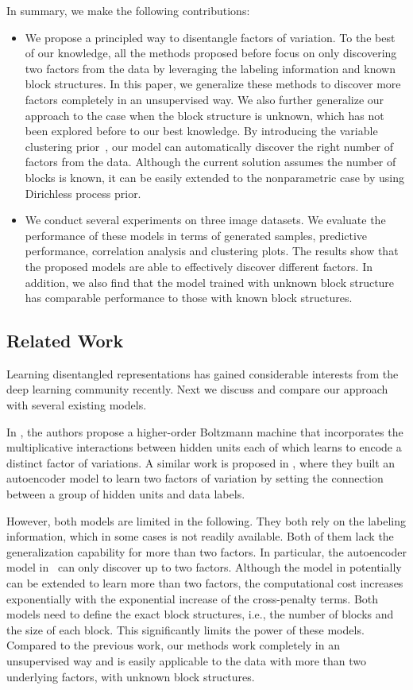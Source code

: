 In summary, we make the following contributions:
\begin{itemize}
\item We propose a principled way to disentangle factors of variation. To the best of our knowledge, all the methods proposed before focus on only discovering two factors from the data by leveraging the labeling information and known block structures. In this paper, we generalize these methods to discover more factors completely in an unsupervised way. We also further generalize our approach to the case when the block structure is unknown, which has not been explored before to our best knowledge. By introducing the variable clustering prior~\cite{palla2012nonparametric}, our model can automatically discover the right number of factors from the data. Although the current solution assumes the number of blocks is known, it can be easily extended to the nonparametric case by using Dirichless process prior.
\item We conduct several experiments on three image datasets. We evaluate the performance of these models in terms of generated samples, predictive performance, correlation analysis and clustering plots. The results show that the proposed models are able to effectively discover different factors. In addition, we also find that the model trained with unknown block structure has comparable performance to those with known block structures.
\end{itemize}


\subsection{Related Work}
Learning disentangled representations has gained considerable interests from the deep learning community recently. Next we discuss and compare our approach with several existing models.

In \cite{reed2014learning}, the authors propose a higher-order Boltzmann machine that incorporates the multiplicative interactions between hidden units each of which learns to encode a distinct factor of variations. A similar work is proposed in \cite{cheung2014discovering}, where they built an autoencoder model to learn two factors of variation by setting the connection between a group of hidden units and data labels.

However, both models are limited in the following. They both rely on the labeling information, which in some cases is not readily available. Both of them lack the generalization capability for more than two factors. In particular, the autoencoder model in~\cite{cheung2014discovering} can only discover up to two factors. Although the model in \cite{reed2014learning} potentially can be extended to learn more than two factors, the computational cost increases exponentially with the exponential increase of the cross-penalty terms. Both models need to define the exact block structures, i.e., the number of blocks and the size of each block. This significantly limits the power of these models. Compared to the previous work, our methods work completely in an unsupervised way and is easily applicable to the data with more than two underlying factors, with unknown block structures.

